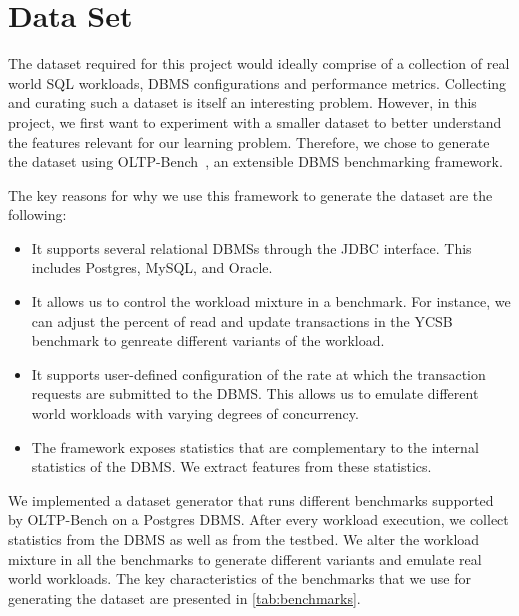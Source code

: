 \section{Data Set} \label{sec:data_set}

The dataset required for this project would ideally comprise of a 
collection of real world SQL workloads, DBMS configurations and performance
metrics. Collecting and curating such a dataset is itself an interesting
problem.
However, in this project, we first want to experiment with a smaller dataset
to better understand the features relevant for our learning problem.
Therefore, we chose to generate the dataset using
OLTP-Bench~\citep{oltpbench14}, an extensible DBMS benchmarking framework.

The key reasons for why we use this framework to generate the dataset 
are the following:

\begin{itemize}
  \item It supports several relational DBMSs through the JDBC interface. This
  includes Postgres, MySQL, and Oracle.
  \item It allows us to control the workload mixture in a benchmark. For
  instance, we can adjust the percent of read and update transactions in 
  the YCSB benchmark to genreate different variants of the workload.
  \item It supports user-defined configuration of the rate at which the
  transaction requests are submitted to the DBMS. This allows us to emulate
  different world workloads with varying degrees of concurrency.
  \item The framework exposes statistics that are complementary to the 
  internal statistics of the DBMS. We extract features from these statistics. 
\end{itemize}

We implemented a dataset generator that runs different benchmarks supported
by OLTP-Bench on a Postgres DBMS. After every workload execution, we
collect statistics from the DBMS as well as from the testbed. We alter the
workload mixture in all the benchmarks to generate different variants and
emulate real world workloads. The key characteristics of the benchmarks
that we use for generating the dataset are presented in \cref{tab:benchmarks}.

